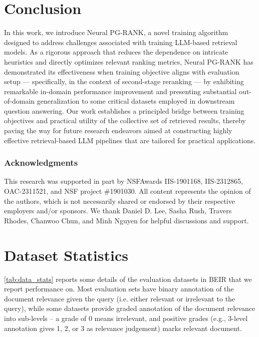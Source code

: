 \documentclass{article}
\begin{document}
\section{Conclusion}


In this work, we introduce Neural PG-RANK, a novel training algorithm designed to address challenges associated with training LLM-based retrieval models. As a rigorous approach that reduces the dependence on intricate heuristics and directly optimizes relevant ranking metrics, Neural PG-RANK has demonstrated its effectiveness when training objective aligns with evaluation setup — specifically, in the context of second-stage reranking — by exhibiting remarkable in-domain performance improvement and presenting substantial out-of-domain generalization to some critical datasets employed in downstream question answering. Our work establishes a principled bridge between training objectives and practical utility of the collective set of retrieved results, thereby paving the way for future research endeavors aimed at constructing highly effective retrieval-based LLM pipelines that are tailored for practical applications. 



\subsubsection*{Acknowledgments}
This research was supported in part by NSFAwards IIS-1901168, IIS-2312865, OAC-2311521, and NSF project \#1901030. All content represents the opinion of the authors, which is not necessarily shared or endorsed by their respective employers and/or sponsors.
We thank Daniel D. Lee, Sasha Rush, Travers Rhodes, Chanwoo Chun, and Minh Nguyen for helpful discussions and support. 



\newpage



\newpage
\appendix
\label{sec:appendix}

\section{Dataset Statistics} \label{sec:data_stats}
\autoref{tab:data_stats} reports some details of the evaluation datasets in BEIR that we report performance on. Most evaluation sets have binary annotation of the document relevance given the query (i.e. either relevant or irrelevant to the query), while some datasets provide graded annotation of the document relevance into sub-levels --
a grade of 0 means irrelevant, and positive grades (e.g., 3-level annotation gives 1, 2, or 3 as relevance judgement) marks relevant document. 
\end{document}
